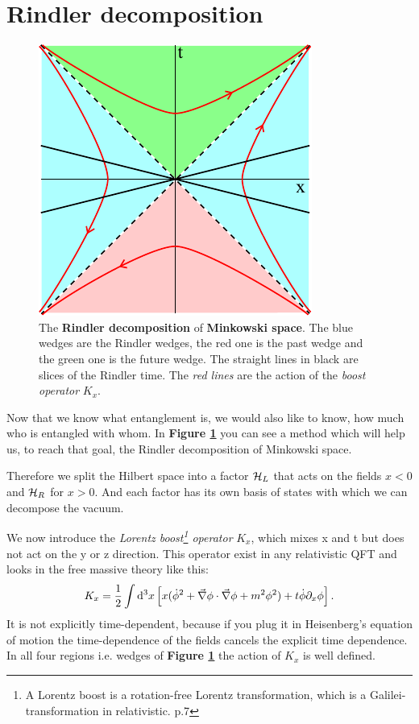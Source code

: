 \section{Rindler decomposition}
\FloatBarrier
		\begin{figure}[tbp]
			\begin{center}
				\includegraphics[scale=1]{boost}
				\caption{The \textbf{Rindler decomposition} of \textbf{Minkowski space}. The blue wedges are the Rindler wedges, the red one is the past wedge and the green one is the future wedge. The straight lines in black are slices of the Rindler time. The \textit{red lines} are the action of the \textit{boost operator} $K_x$.}\label{Rindler}
			\end{center}
		\end{figure}
	Now that we know  what entanglement is, we would also like to know, how much who is entangled with whom. In \textbf{Figure \ref{Rindler}} you can see a method which will help us, to reach that goal, the Rindler decomposition of Minkowski space.
	
	Therefore we split the Hilbert space into a factor $\mathcal{H}_L$ that acts on the fields $x<0$ and $\mathcal{H}_R$ for $x>0$. And each factor has its own basis of states with which we can decompose the vacuum.
	
	We now introduce the \textit{Lorentz boost\footnote{A Lorentz boost is a rotation-free Lorentz transformation, which is a Galilei-transformation in relativistic.\cite{ARTfliesbach} p.7} operator} $K_x$, which mixes x and t but does not act on the y or z direction. This operator exist in any relativistic QFT and looks in the free massive theory like this:
	\begin{equation}
		K_x = \frac{1}{2} \int \mathrm{d}^3 x 
		\left[ x (\dot{\phi}^2 + \vec{\nabla} \phi \cdot \vec{\nabla} \phi + m^2 \phi^2) + t\dot{\phi} \partial_x \phi
		\right].
	\end{equation}
	It is not explicitly time-dependent, because if you plug it in Heisenberg's equation of motion the time-dependence of the fields cancels the explicit time dependence.  In all four regions i.e. wedges of \textbf{Figure \ref{Rindler}} the action of $K_x$ is well defined. 
	
